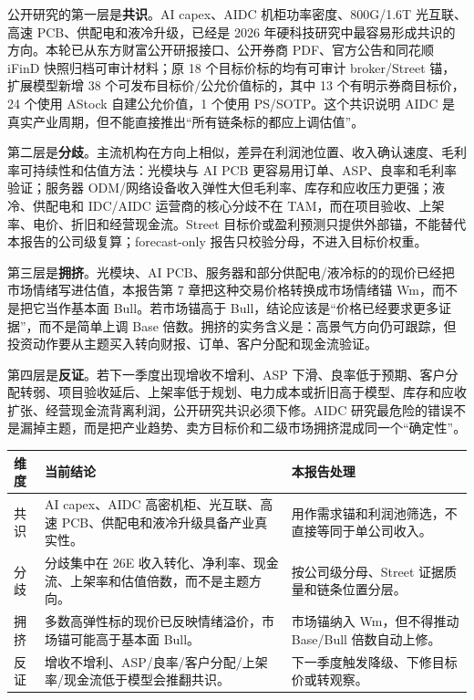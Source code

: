 公开研究的第一层是\textbf{共识}。AI capex、AIDC 机柜功率密度、800G/1.6T 光互联、高速 PCB、供配电和液冷升级，已经是 2026 年硬科技研究中最容易形成共识的方向。本轮已从东方财富公开研报接口、公开券商 PDF、官方公告和同花顺 iFinD 快照归档可审计材料；原 18 个目标价标的均有可审计 broker/Street 锚，扩展模型新增 38 个可发布目标价/公允价值标的，其中 13 个有明示券商目标价，24 个使用 AStock 自建公允价值，1 个使用 PS/SOTP。这个共识说明 AIDC 是真实产业周期，但不能直接推出“所有链条标的都应上调估值”。

第二层是\textbf{分歧}。主流机构在方向上相似，差异在利润池位置、收入确认速度、毛利率可持续性和估值方法：光模块与 AI PCB 更容易用订单、ASP、良率和毛利率验证；服务器 ODM/网络设备收入弹性大但毛利率、库存和应收压力更强；液冷、供配电和 IDC/AIDC 运营商的核心分歧不在 TAM，而在项目验收、上架率、电价、折旧和经营现金流。Street 目标价或盈利预测只提供外部锚，不能替代本报告的公司级复算；forecast-only 报告只校验分母，不进入目标价权重。

第三层是\textbf{拥挤}。光模块、AI PCB、服务器和部分供配电/液冷标的的现价已经把市场情绪写进估值，本报告第 7 章把这种交易价格转换成市场情绪锚 Wm，而不是把它当作基本面 Bull。若市场锚高于 Bull，结论应该是“价格已经要求更多证据”，而不是简单上调 Base 倍数。拥挤的实务含义是：高景气方向仍可跟踪，但投资动作要从主题买入转向财报、订单、客户分配和现金流验证。

第四层是\textbf{反证}。若下一季度出现增收不增利、ASP 下滑、良率低于预期、客户分配转弱、项目验收延后、上架率低于规划、电力成本或折旧高于模型、库存和应收扩张、经营现金流背离利润，公开研究共识必须下修。AIDC 研究最危险的错误不是漏掉主题，而是把产业趋势、卖方目标价和二级市场拥挤混成同一个“确定性”。

\begin{exhibitbox}
\begin{tabularx}{\textwidth}{L{2.4cm}X X}
\toprule
\textbf{维度} & \textbf{当前结论} & \textbf{本报告处理}\\
\midrule
共识 & AI capex、AIDC 高密机柜、光互联、高速 PCB、供配电和液冷升级具备产业真实性。 & 用作需求锚和利润池筛选，不直接等同于单公司收入。\\
分歧 & 分歧集中在 26E 收入转化、净利率、现金流、上架率和估值倍数，而不是主题方向。 & 按公司级分母、Street 证据质量和链条位置分层。\\
拥挤 & 多数高弹性标的现价已反映情绪溢价，市场锚可能高于基本面 Bull。 & 市场锚纳入 Wm，但不得推动 Base/Bull 倍数自动上修。\\
反证 & 增收不增利、ASP/良率/客户分配/上架率/现金流低于模型会推翻共识。 & 下一季度触发降级、下修目标价或转观察。\\
\bottomrule
\end{tabularx}
\end{exhibitbox}

